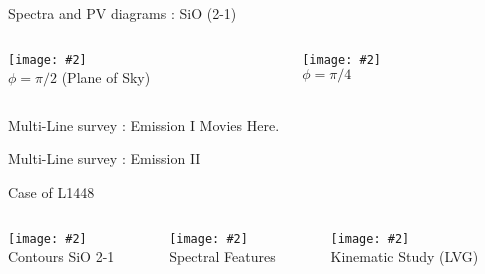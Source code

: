 \documentclass[8pt,xcolor=dvipsnames]{beamer}
\newcommand{\figpath}{/home/phybva/SiOJets_New/TALK/NEWFIGS}
\newcommand{\spic}[2]{\texttt{[image: \#2]}}
\newcommand{\myref}[1]{{\small{\color{red}{(#1)}}}}
\begin{document}
\begin{frame}{Spectra and PV diagrams : SiO (2-1)}
\begin{columns}
\begin{column}{0.48\textwidth}
\spic{0.17}{\figpath/pfig8.pdf}\\
\hspace{0.2cm} $\phi = \pi/2$ (Plane of Sky)
\end{column}
\hfill
\begin{column}{0.48\textwidth}
\spic{0.17}{\figpath/pfig9.pdf}\\
\hspace{0.2cm}$\phi = \pi/4$ 
\end{column}
\end{columns}
\end{frame}

\begin{frame}{Multi-Line survey : Emission I}
Movies Here.
\end{frame}

\begin{frame}{Multi-Line survey : Emission II}
\end{frame}

\begin{frame}{Case of L1448 \myref{Nisini 2007}}
\begin{columns}[t]
\begin{column}{0.25\textwidth}
\spic{0.1}{\figpath/Nisini2007_f1.pdf}\\
Contours SiO 2-1
\end{column}

\begin{column}{0.40\textwidth}
 \spic{0.25}{\figpath/Nisini2007_f4.pdf}\\
 Spectral Features
\end{column}

\begin{column}{0.25\textwidth}
\spic{0.25}{\figpath/Nisini2007_f6.pdf} \\
Kinematic Study (LVG) 
\end{column}

\end{columns}
\end{frame}
\end{document}

